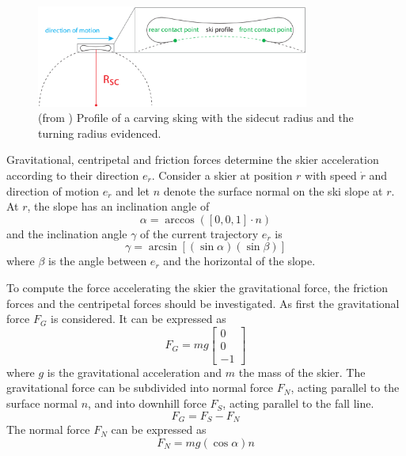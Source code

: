 \documentclass[12pt,a4paper,twoside]{book}
\begin{document}
\begin{figure}
  \begin{center}
    \includegraphics[width=0.8\textwidth]{images/sidecut_radius.eps}
    \caption{(from \cite{hol2012}) Profile of a carving sking with the sidecut radius and the turning radius evidenced.}\label{sidecut_radius}
  \end{center}
\end{figure}

Gravitational, centripetal and friction forces determine the skier acceleration according to their direction $e_{\dot{r}}$. Consider a skier at position $r$ with speed $\dot{r}$ and direction of motion $e_{\dot{r}}$ and let $n$ denote the surface normal on the ski slope at $r$. At $r$, the slope has an inclination angle of
\begin{equation}
\alpha =\arccos(\left[0,0,1\right] \cdot n)
\end{equation}
and the inclination angle $\gamma$ of the current trajectory $e_{\dot{r}}$ is
\begin{equation}
\gamma =\arcsin[(\sin \alpha )(\sin \beta )]
\end{equation}
where $\beta$ is the angle between $e_{\dot{r}}$ and the horizontal of the slope.

To compute the force accelerating the skier the gravitational force, the friction forces and the centripetal forces should be investigated. As first the gravitational force $F_G$ is considered. It can be expressed as
\begin{equation}
F_G=mg\left[\begin{matrix}0\\0\\-1\end{matrix}\right]
\end{equation}
where $g$ is the gravitational acceleration and $m$ the mass of the skier. The gravitational force can be subdivided into normal force $F_N$, acting parallel to the surface normal $n$, and into downhill force $F_S$, acting parallel to the fall line.
\begin{equation}\label{downhill_force}
F_G=F_S-F_N
\end{equation}
The normal force $F_N$ can be expressed as
\begin{equation}
F_N=mg(\cos \alpha )n
\end{equation}
\end{document}
